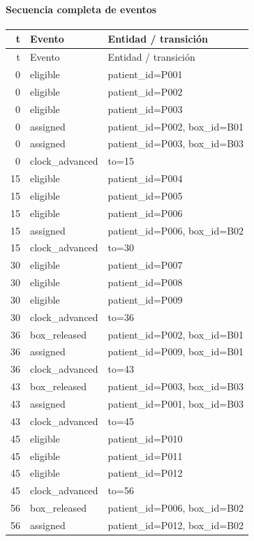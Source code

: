 \paragraph{Secuencia completa de eventos}
\begin{longtable}{r p{2.2cm} p{4.2cm}}
\toprule t & Evento & Entidad / transición \\
\midrule\endfirsthead
\toprule t & Evento & Entidad / transición \\
\midrule\endhead
0 & eligible & patient\_id=P001 \\
0 & eligible & patient\_id=P002 \\
0 & eligible & patient\_id=P003 \\
0 & assigned & patient\_id=P002, box\_id=B01 \\
0 & assigned & patient\_id=P003, box\_id=B03 \\
0 & clock\_advanced & to=15 \\
15 & eligible & patient\_id=P004 \\
15 & eligible & patient\_id=P005 \\
15 & eligible & patient\_id=P006 \\
15 & assigned & patient\_id=P006, box\_id=B02 \\
15 & clock\_advanced & to=30 \\
30 & eligible & patient\_id=P007 \\
30 & eligible & patient\_id=P008 \\
30 & eligible & patient\_id=P009 \\
30 & clock\_advanced & to=36 \\
36 & box\_released & patient\_id=P002, box\_id=B01 \\
36 & assigned & patient\_id=P009, box\_id=B01 \\
36 & clock\_advanced & to=43 \\
43 & box\_released & patient\_id=P003, box\_id=B03 \\
43 & assigned & patient\_id=P001, box\_id=B03 \\
43 & clock\_advanced & to=45 \\
45 & eligible & patient\_id=P010 \\
45 & eligible & patient\_id=P011 \\
45 & eligible & patient\_id=P012 \\
45 & clock\_advanced & to=56 \\
56 & box\_released & patient\_id=P006, box\_id=B02 \\
56 & assigned & patient\_id=P012, box\_id=B02 \\

\end{longtable}
